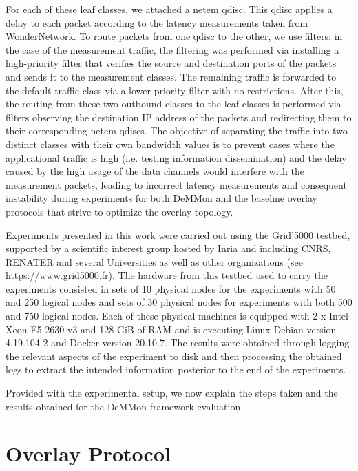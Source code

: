 For each of these leaf classes, we attached a netem qdisc. This qdisc applies a delay to each packet according to the latency measurements taken from WonderNetwork. To route packets from one qdisc to the other, we use filters: in the case of the measurement traffic, the filtering was performed via installing a high-priority filter that verifies the source and destination ports of the packets and sends it to the measurement classes. The remaining traffic is forwarded to the default traffic class via a lower priority filter with no restrictions. After this, the routing from these two outbound classes to the leaf classes is performed via filters observing the destination IP address of the packets and redirecting them to their corresponding netem qdiscs.  The objective of separating the traffic into two distinct classes with their own bandwidth values is to prevent cases where the applicational traffic is high (i.e. testing information dissemination) and the delay caused by the high usage of the data channels would interfere with the measurement packets, leading to incorrect latency measurements and consequent instability during experiments for both DeMMon and the baseline overlay protocols that strive to optimize the overlay topology. 

Experiments presented in this work were carried out using the Grid'5000 testbed, supported by a scientific interest group hosted by Inria and including CNRS, RENATER and several Universities as well as other organizations (see https://www.grid5000.fr). The hardware from this testbed used to carry the experiments consisted in sets of 10 physical nodes for the experiments with 50 and 250 logical nodes and sets of 30 physical nodes for experiments with both 500 and 750 logical nodes. Each of these physical machines is equipped with 2 x Intel Xeon E5-2630 v3 and 128 GiB of RAM and is executing Linux Debian version 4.19.104-2 and Docker version 20.10.7. The results were obtained through logging the relevant aspects of the experiment to disk and then processing the obtained logs to extract the intended information posterior to the end of the experiments.

Provided with the experimental setup, we now explain the steps taken and the results obtained for the DeMMon framework evaluation.

\section{Overlay Protocol} \label{sec:overlay_proto_eval} 

